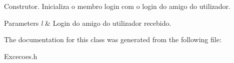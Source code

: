 Construtor. Inicializa o membro login com o login do amigo do utilizador. 


\begin{DoxyParams}{Parameters}
{\em l} & Login do amigo do utilizador recebido. \\
\hline
\end{DoxyParams}


The documentation for this class was generated from the following file\+:\begin{DoxyCompactItemize}
\item 
Excecoes.\+h\end{DoxyCompactItemize}
